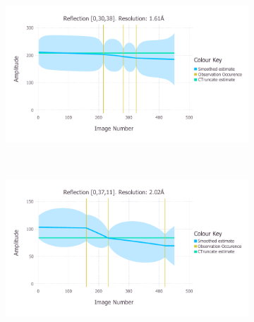 \begin{figure}
	\centering
    \begin{subfigure}[b]{1.0\textwidth}
        \centering
        \includegraphics[width=\textwidth]{figures/datared/SmoothedPlot_0,30,38_res2.pdf}
        \caption{}
        \label{fig:Amplitude estimates ref 0,30,38 - insulin}
    \end{subfigure}
    \\
	\begin{subfigure}[b]{1.0\textwidth}
        \centering
        \includegraphics[width=\textwidth]{figures/datared/SmoothedPlot_0,37,11_res2.pdf}
        \caption{}
        \label{fig:Amplitude estimates ref 0,37,11 - insulin}
    \end{subfigure}
\end{figure}
